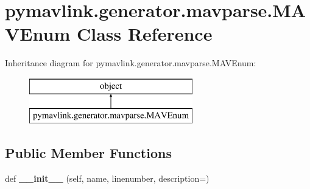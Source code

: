\hypertarget{classpymavlink_1_1generator_1_1mavparse_1_1MAVEnum}{}\section{pymavlink.\+generator.\+mavparse.\+M\+A\+V\+Enum Class Reference}
\label{classpymavlink_1_1generator_1_1mavparse_1_1MAVEnum}
Inheritance diagram for pymavlink.\+generator.\+mavparse.\+M\+A\+V\+Enum\+:\begin{figure}[H]
\begin{center}
\leavevmode
\includegraphics[height=2.000000cm]{classpymavlink_1_1generator_1_1mavparse_1_1MAVEnum}
\end{center}
\end{figure}
\subsection*{Public Member Functions}
\begin{DoxyCompactItemize}
\item 
\mbox{\label{classpymavlink_1_1generator_1_1mavparse_1_1MAVEnum_a2f523a538af870a22eade7a19ec76ccc}} 
def {\bfseries \+\_\+\+\_\+init\+\_\+\+\_\+} (self, name, linenumber, description=\textquotesingle{}\textquotesingle{})
\end{DoxyCompactItemize}

